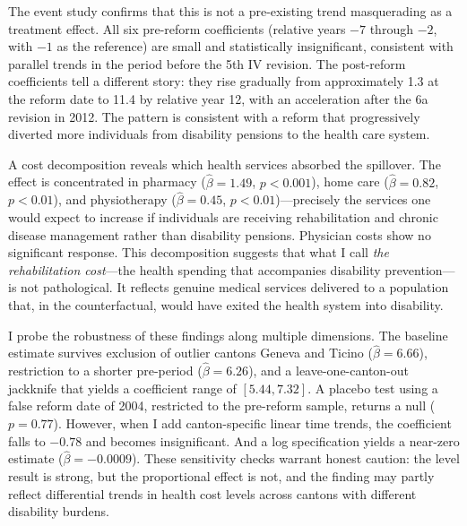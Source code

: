 \documentclass[12pt]{article}
\begin{document}
The event study confirms that this is not a pre-existing trend masquerading as a treatment effect. All six pre-reform coefficients (relative years $-7$ through $-2$, with $-1$ as the reference) are small and statistically insignificant, consistent with parallel trends in the period before the 5th IV revision. The post-reform coefficients tell a different story: they rise gradually from approximately 1.3 at the reform date to 11.4 by relative year 12, with an acceleration after the 6a revision in 2012. The pattern is consistent with a reform that progressively diverted more individuals from disability pensions to the health care system.

A cost decomposition reveals which health services absorbed the spillover. The effect is concentrated in pharmacy ($\hat{\beta} = 1.49$, $p < 0.001$), home care ($\hat{\beta} = 0.82$, $p < 0.01$), and physiotherapy ($\hat{\beta} = 0.45$, $p < 0.01$)---precisely the services one would expect to increase if individuals are receiving rehabilitation and chronic disease management rather than disability pensions. Physician costs show no significant response. This decomposition suggests that what I call \emph{the rehabilitation cost}---the health spending that accompanies disability prevention---is not pathological. It reflects genuine medical services delivered to a population that, in the counterfactual, would have exited the health system into disability.

I probe the robustness of these findings along multiple dimensions. The baseline estimate survives exclusion of outlier cantons Geneva and Ticino ($\hat{\beta} = 6.66$), restriction to a shorter pre-period ($\hat{\beta} = 6.26$), and a leave-one-canton-out jackknife that yields a coefficient range of $[5.44, 7.32]$. A placebo test using a false reform date of 2004, restricted to the pre-reform sample, returns a null ($p = 0.77$). However, when I add canton-specific linear time trends, the coefficient falls to $-0.78$ and becomes insignificant. And a log specification yields a near-zero estimate ($\hat{\beta} = -0.0009$). These sensitivity checks warrant honest caution: the level result is strong, but the proportional effect is not, and the finding may partly reflect differential trends in health cost levels across cantons with different disability burdens.
\end{document}

